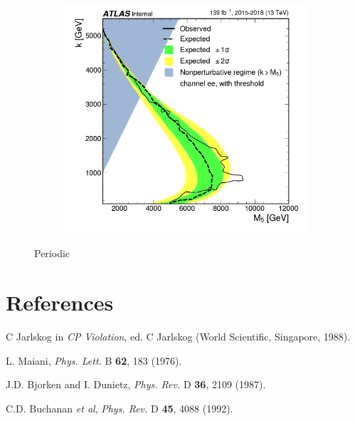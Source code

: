 \documentclass{moriond}
\def\Journal#1#2#3#4{{#1} {\bf #2}, #3 (#4)}
\def\PLB{{\em Phys. Lett.}  B}
\def\PRD{{\em Phys. Rev.} D}
\begin{document}
\begin{figure}[htp]
\begin{subfigure}[b]{0.32\textwidth}
         \caption{}
         \label{fig:shape}
     \end{subfigure}
     \begin{subfigure}[b]{0.32\textwidth}
         \centering
         \includegraphics[width=\textwidth]{periodic}
         \caption{}
         \label{fig:perlimits}
     \end{subfigure}
        \caption{Periodic}
        \label{fig:periodic}
\end{figure}




\section*{References}

\begin{thebibliography}{99}
C Jarlskog in {\em CP Violation}, ed. C Jarlskog
(World Scientific, Singapore, 1988).

L. Maiani, \Journal{\PLB}{62}{183}{1976}.

J.D. Bjorken and I. Dunietz, \Journal{\PRD}{36}{2109}{1987}.

C.D. Buchanan {\it et al}, \Journal{\PRD}{45}{4088}{1992}.

\end{thebibliography}
\end{document}
